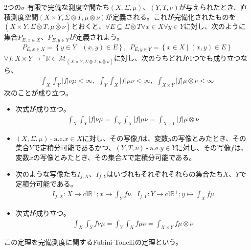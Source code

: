 \documentclass[dvipdfmx]{jsarticle}
\begin{document}
\begin{thm}\label{4.6.4.8}
2つの$\sigma$-有限で完備な測度空間たち$(X,\varSigma,\mu)$、$(Y,T,\nu)$が与えられたとき、直積測度空間$(X \times Y, \varSigma \otimes T, \mu \otimes \nu)$が定義される。これが完備化されたものを$\left( X \times Y, \overline{\varSigma \otimes T}, \overline{\mu \otimes \nu} \right)$とおくと、$\forall E \subseteq \overline{\varSigma \otimes T}\forall x \in X\forall y \in Y$に対し、次のように集合$P_{E,x \in X}$、$P_{E,y \in Y}$が定義されよう。
\begin{align*}
P_{E,x \in X} = \left\{ y \in Y \middle| (x,y) \in E \right\},\ \ P_{E,y \in Y} = \left\{ x \in X \middle| (x,y) \in E \right\}
\end{align*}
$\forall f:X \times Y \rightarrow{}^{*}\mathbb{R} \in \mathcal{M}_{\left( X \times Y, \overline{\varSigma \otimes T}, \overline{\mu \otimes \nu} \right)}$に対し、次のうちどれか1つでも成り立つなら、
\begin{align*}
\int_{X} {\int_{Y} {|f|\nu}\mu} < \infty,\ \ \int_{Y} {\int_{X} {|f|\mu}\nu} < \infty,\ \ \int_{X \times Y} {|f|\mu \otimes \nu} < \infty
\end{align*}
次のことが成り立つ。
\begin{itemize}
\item
  次式が成り立つ。
\begin{align*}
\int_{X} {\int_{Y} {|f|\nu}\mu} = \int_{Y} {\int_{X} {|f|\mu}\nu} = \int_{X \times Y} {|f|\mu \otimes \nu}
\end{align*}
\item
  $(X,\varSigma,\mu) \ \text{-} \ \mathrm{a.e.}x \in X$に対し、その写像$f$は、変数$y$の写像とみたとき、その集合$Y$で定積分可能であるかつ、$(Y,T,\nu) \ \text{-} \ \mathrm{a.e.}y \in Y$に対し、その写像$f$は、変数$x$の写像とみたとき、その集合$X$で定積分可能である。
\item
  次のような写像たち$I_{f,X}$、$I_{f,Y}$はいづれもそれぞれそれらの集合たち$X$、$Y$で定積分可能である。
\begin{align*}
I_{f,X}:X \rightarrow \mathrm{cl}\mathbb{R}^{+};x \mapsto \int_{Y} {f\nu},\ \ I_{f,Y}:Y \rightarrow \mathrm{cl}\mathbb{R}^{+};y \mapsto \int_{X} {f\mu}
\end{align*}
\item
  次式が成り立つ。
\begin{align*}
\int_{X} {\int_{Y} {f\nu}\mu} = \int_{Y} {\int_{X} {f\mu}\nu} = \int_{X \times Y} {f\mu \otimes \nu}
\end{align*}
\end{itemize}
この定理を完備測度に関するFubini-Tonelliの定理という。
\end{thm}
\end{document}
